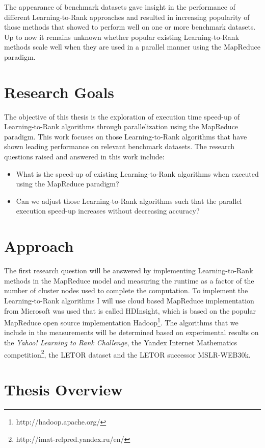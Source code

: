 The appearance of benchmark datasets gave insight in the performance of different Learning-to-Rank approaches and resulted in increasing popularity of those methods that showed to perform well on one or more benchmark datasets. Up to now it remains unknown whether popular existing Learning-to-Rank methods scale well when they are used in a parallel manner using the MapReduce paradigm.\\

\chapter{Research Goals}
The objective of this thesis is the exploration of execution time speed-up of Learning-to-Rank algorithms through parallelization using the MapReduce paradigm. 
This work focuses on those Learning-to-Rank algorithms that have shown leading performance on relevant benchmark datasets.
The research questions raised and answered in this work include:
\begin{itemize}
\item What is the speed-up of existing Learning-to-Rank algorithms when executed using the MapReduce paradigm?
\item Can we adjust those Learning-to-Rank algorithms such that the parallel execution speed-up increases without decreasing accuracy?
\end{itemize}

\chapter{Approach}
The first research question will be answered by implementing Learning-to-Rank methods in the MapReduce model and measuring the runtime as a factor of the number of cluster nodes used to complete the computation.
To implement the Learning-to-Rank algorithms I will use cloud based MapReduce implementation from Microsoft was used that is called HDInsight, which is based on the popular MapReduce open source implementation Hadoop\footnote{http://hadoop.apache.org/}.
The algorithms that we include in the measurements will be determined based on experimental results on the \emph{Yahoo! Learning to Rank Challenge}\cite{Chapelle2011a}, the Yandex Internet Mathematics competition\footnote{http://imat-relpred.yandex.ru/en/}, the LETOR\cite{Qin2010} dataset and the LETOR successor MSLR-WEB30k.

\chapter{Thesis Overview}

